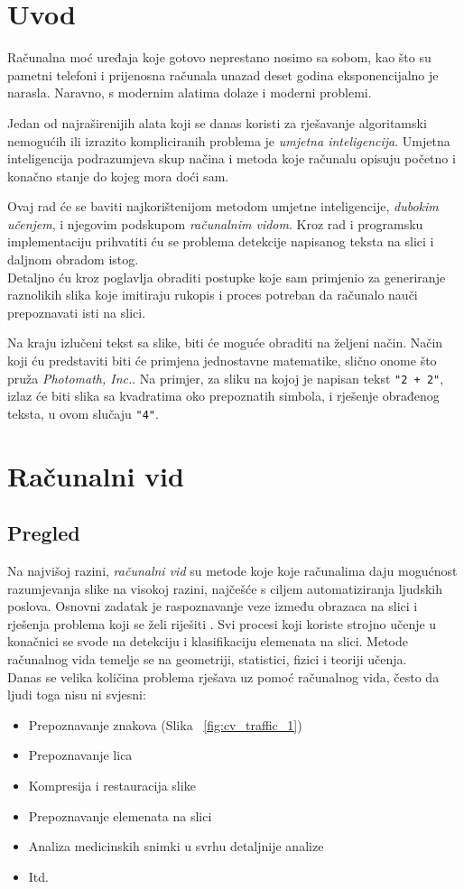 \section{Uvod}
Računalna moć uređaja koje gotovo neprestano nosimo sa sobom, kao što su pametni telefoni i prijenosna računala unazad deset godina eksponencijalno je narasla. 
Naravno, s modernim alatima dolaze i moderni problemi. 

Jedan od najraširenijih alata koji se danas koristi za rješavanje algoritamski nemogućih ili izrazito kompliciranih problema je \emph{umjetna inteligencija}.
Umjetna inteligencija podrazumjeva skup načina i metoda koje računalu opisuju početno i konačno stanje do kojeg mora doći sam.

Ovaj rad će se baviti najkorištenijom metodom umjetne inteligencije, \emph{dubokim učenjem}, i njegovim podskupom \emph{računalnim vidom}.
Kroz rad i programsku implementaciju prihvatiti ću se problema detekcije napisanog teksta na slici i daljnom obradom istog. \\
Detaljno ću kroz poglavlja obraditi postupke koje sam primjenio za generiranje raznolikih slika koje imitiraju rukopis i proces potreban da računalo nauči prepoznavati isti na slici.

Na kraju izlučeni tekst sa slike, biti će moguće obraditi na željeni način.
Način koji ću predstaviti biti će primjena jednostavne matematike, slično onome što pruža \emph{Photomath, Inc.}. 
Na primjer, za sliku na kojoj je napisan tekst \texttt{"2 + 2"}, izlaz će biti slika sa kvadratima oko prepoznatih simbola, i rješenje obrađenog teksta, u ovom slučaju \texttt{"4"}.

\section{Računalni vid}

\subsection{Pregled}
Na najvišoj razini, \emph{računalni vid} su metode koje koje računalima daju mogućnost razumjevanja slike na visokoj razini, najčešće s ciljem automatiziranja ljudskih poslova.
Osnovni zadatak je raspoznavanje veze između obrazaca na slici i rješenja problema koji se želi riješiti \cite{ballard1982computer}. 
Svi procesi koji koriste strojno učenje u konačnici se svode na  detekciju i klasifikaciju elemenata na slici.
Metode računalnog vida temelje se na geometriji, statistici, fizici i teoriji učenja. \\
Danas se velika količina problema rješava uz pomoć računalnog vida, često da ljudi toga nisu ni svjesni:
\begin{itemize}
\item Prepoznavanje znakova (Slika ~\ref{fig:cv_traffic_1})	
\item Prepoznavanje lica
\item Kompresija i restauracija slike
\item Prepoznavanje elemenata na slici
\item Analiza medicinskih snimki u svrhu detaljnije analize
\item Itd.
\end{itemize} 

